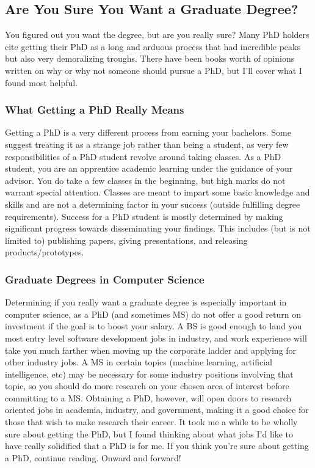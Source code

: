 \documentclass[12pt]{article}
\begin{document}
\subsection{Are You Sure You Want a Graduate Degree?}

You figured out you want the degree, but are you really sure? Many PhD holders cite getting their PhD as a long and arduous process that had incredible peaks but also very demoralizing troughs. \cite{AzumaPhD} There have been books worth of opinions written on why or why not someone should pursue a PhD, but I’ll cover what I found most helpful.

\subsubsection{What Getting a PhD Really Means}

Getting a PhD is a very different process from earning your bachelors. Some suggest treating it as a strange job rather than being a student, as very few responsibilities of a PhD student revolve around taking classes. \cite{AzumaPhD} As a PhD student, you are an apprentice academic learning under the guidance of your advisor. You do take a few classes in the beginning, but high marks do not warrant special attention. Classes are meant to impart some basic knowledge and skills and are not a determining factor in your success (outside fulfilling degree requirements). Success for a PhD student is mostly determined by making significant progress towards disseminating your findings. This includes (but is not limited to) publishing papers, giving presentations, and releasing products/prototypes.

\subsubsection{Graduate Degrees in Computer Science}

Determining if you really want a graduate degree is especially important in computer science, as a PhD (and sometimes MS) do not offer a good return on investment if the goal is to boost your salary. A BS is good enough to land you most entry level software development jobs in industry, and work experience will take you much farther when moving up the corporate ladder and applying for other industry jobs. A MS in certain topics (machine learning, artificial intelligence, etc) may be necessary for some industry positions involving that topic, so you should do more research on your chosen area of interest before committing to a MS. Obtaining a PhD, however, will open doors to research oriented jobs in academia, industry, and government, making it a good choice for those that wish to make research their career. \cite{robertsonwebsite} It took me a while to be wholly sure about getting the PhD, but I found thinking about what jobs I'd like to have really solidified that a PhD is for me. If you think you're sure about getting a PhD, continue reading. Onward and forward!
\end{document}
